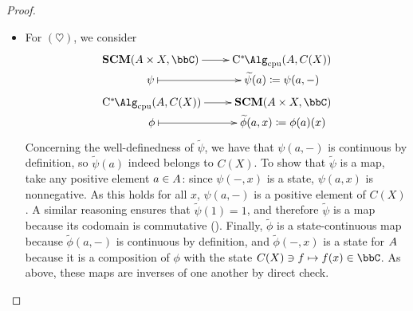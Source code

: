 \begin{proof}
\begin{itemize}
		\item For $(\heartsuit)$, we consider
		      \[\begin{gathered}
			      \xymatrix@R=.1pt{
										\mathbf{SCM}(\A\times X,\bbC)  \ar[r]
										& \Calgcpu(\A,C(X)) \\
										\psi  \ar@{|->}[r]
										& \widetilde{\psi}(a)\coloneqq  \psi(a,-)
										} \\
										\xymatrix@R=.1pt{
											\Calgcpu(\A,C(X)) \ar[r]
											& \mathbf{SCM}(\A\times X,\bbC) \\
											\phi  \ar@{|->}[r]
											& \widetilde{\phi}(a,x)\coloneqq \phi(a)(x)
											}
										\end{gathered}
		      \]
		      Concerning the well-definedness of $\widetilde{\psi}$, we have that $\psi(a,-)$ is continuous by definition, so $\widetilde{\psi}(a)$ indeed belongs to $C(X)$.
		      To show that $\widetilde{\psi}$ is a \cpu{} map, take any positive element $a\in {A}$: since $\psi(-,x)$ is a state, $\psi(a,x)$ is nonnegative.
		      As this holds for all $x$, $\psi(a,-)$ is a positive element of $C(X)$.
		      A similar reasoning ensures that $\widetilde{\psi}(1)=1$, and therefore $\widetilde{\psi}$ is a \cpu{} map because its codomain is commutative (\cite[Theorem 3.9]{paulsen2002}).
		      Finally, $\widetilde{\phi}$ is a state-continuous map because $\widetilde{\phi}(a,-)$ is continuous by definition, and $\widetilde{\phi}(-,x)$ is a state for ${A}$ because it is a composition of $\phi$ with the state $C(X)\owns f\mapsto f(x)\in \bbC$.
		      As above, these maps are inverses of one another by direct check.
		      \qedhere
	\end{itemize}

\end{proof}
